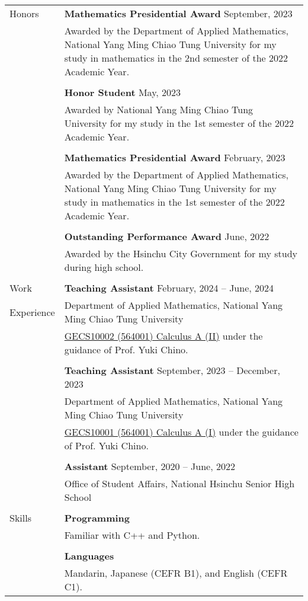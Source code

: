 \documentclass[letterpaper, 11pt]{article}
\begin{document}
\begin{longtable}{p{0.8in}p{5.5in}}
{\textcolor{OliveGreen}{Honors}}
& \textbf{Mathematics Presidential Award} \hfill September, 2023\\
& Awarded by the Department of Applied Mathematics, National Yang Ming Chiao Tung University for my study in mathematics in the 2nd semester of the 2022 Academic Year.\\
& \\
& \textbf{Honor Student} \hfill May, 2023\\
& Awarded by National Yang Ming Chiao Tung University for my study in the 1st semester of the 2022 Academic Year. \\
& \\
& \textbf{Mathematics Presidential Award} \hfill February, 2023\\
& Awarded by the Department of Applied Mathematics, National Yang Ming Chiao Tung University for my study in mathematics in the 1st semester of the 2022 Academic Year.\\
& \\
& \textbf{Outstanding Performance Award} \hfill June, 2022\\
& Awarded by the Hsinchu City Government for my study during high school.\\
& \\


{\textcolor{OliveGreen}{Work}} 
& \textbf{Teaching Assistant}  \hfill February, 2024 -- June, 2024 \\
{\textcolor{OliveGreen}{Experience}} 
& Department of Applied Mathematics, National Yang Ming Chiao Tung University\\
& \href{https://reurl.cc/RqoMez}{GECS10002 (564001) Calculus A (II)} under the guidance of Prof. Yuki Chino. \\
& \\

& \textbf{Teaching Assistant} \hfill September, 2023 -- December, 2023 \\
& Department of Applied Mathematics, National Yang Ming Chiao Tung University\\
& \href{https://reurl.cc/Djp5jN}{GECS10001 (564001) Calculus A (I)} under the guidance of Prof. Yuki Chino.\\
& \\

& \textbf{Assistant} \hfill September, 2020 -- June, 2022 \\
& Office of Student Affairs, National Hsinchu Senior High School\\
& \\


{\textcolor{OliveGreen}{Skills}} 
& \textbf{Programming}\\
& Familiar with C++ and Python. \\
& \\

& \textbf{Languages} \\
& Mandarin, Japanese (CEFR B1), and English (CEFR C1). \\


\end{longtable}
\end{document}
